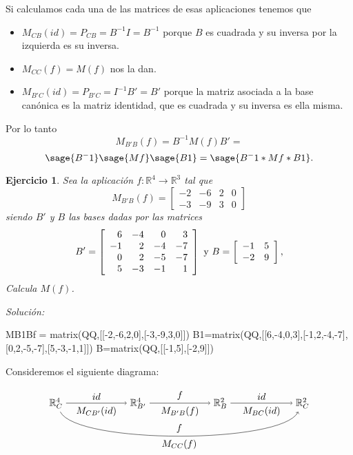 \documentclass{amsart}
\newtheorem{ejer}{Ejercicio}
\def\r{\mathbb{R}}
\begin{document}
Si calculamos cada una de las matrices de esas aplicaciones tenemos que
\begin{itemize}
\item $M_{CB}(id) = P_{CB} = B^{-1}I = B^{-1}$ porque $B$ es cuadrada
y su inversa por la izquierda es su inversa.
\item $M_{CC}(f) = M(f)$ nos la dan.
\item $M_{B'C}(id) = P_{B'C} = I^{-1}B'= B'$ porque la matriz asociada a la
base canónica es la matriz identidad, que es cuadrada y su inversa 
es ella misma. 
\end{itemize}

Por lo tanto
\[ M_{B'B}(f) = B^{-1}M(f)B' = \] \[ \sage{B^-1}\sage{Mf}\sage{B1} = 
\sage{B^-1*Mf*B1}. \]


\begin{ejer} 
Sea la aplicación $f: \r ^4\to \r ^3$ tal que 
\[ M_{B'B}(f) = \left[ \begin{array}{rrrr} -2 & -6 & 2 & 0 \\ -3 & -9 & 3 & 0 \end{array} \right] \] siendo $B'$ y $B$ las bases dadas por las matrices 
\[ B' = \left[ \begin{array}{rrrr} 6 & -4 & 0 & 3\\ -1 & 2 & -4 & -7\\ 
0 & 2 & -5 & -7\\ 5 & -3 & -1 & 1 \end{array} \right] \ \hbox{y} \ B = \left[ \begin{array}{rr} -1 & 5\\ -2 & 9 \end{array} \right],  \] 
Calcula $M(f)$.
\end{ejer}

{\it Soluci\'on:}
\begin{sageblock}
MB1Bf = matrix(QQ,[[-2,-6,2,0],[-3,-9,3,0]])
B1=matrix(QQ,[[6,-4,0,3],[-1,2,-4,-7],[0,2,-5,-7],[5,-3,-1,1]])
B=matrix(QQ,[[-1,5],[-2,9]])
\end{sageblock}

Consideremos el siguiente diagrama:

$$
\begin{tikzpicture}[xscale = 1.5]
\node (RCa) at (0,0) {$\r^4_C$};
\node (RBp) at (2,0) {$\r^4_{B'}$};
\node (RB)  at (4,0) {$\r^2_B$};
\node (RCb) at (6,0) {$\r^2_C$};
\draw[->] (RCa) to node [above] {$id$} 
                   node [below] {$M_{CB'}(id)$} (RBp);
\draw[->] (RBp) to node [above] {$f$} 
                   node [below] {$M_{B'B}(f)$} (RB); 
\draw[->] (RB)  to node [above] {$id$} 
                   node [below] {$M_{BC}(id)$} (RCb);
\draw[->] (RCa) .. controls (0.5,-1.5) and (5.5,-1.5) .. 
                node [below] {$M_{CC}(f)$} 
                node [above] {$f$} (RCb);
\end{tikzpicture}
$$
\end{document}
